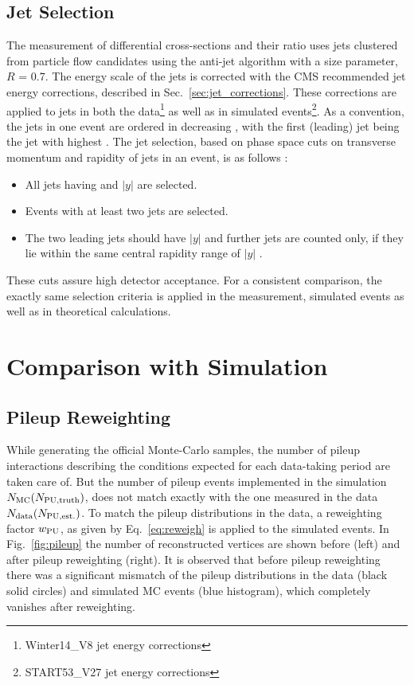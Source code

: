 \subsection{Jet Selection}
The measurement of differential cross-sections and their ratio uses jets clustered from particle flow candidates using the anti-\kt jet algorithm with a size parameter, $R$ = 0.7. The energy scale of the jets is corrected with the CMS recommended jet energy corrections, described in Sec.~\ref{sec:jet_corrections}. These corrections are applied to jets in both the data\footnote{Winter14\_V8 jet energy corrections} as well as in simulated events\footnote{START53\_V27 jet energy corrections}. As a convention, the jets in one event are ordered in decreasing \pt, with the first (leading) jet being the jet with highest \pt. The jet selection, based on phase space cuts on transverse momentum and rapidity of jets in an event, is as follows : 

\begin{itemize}
\item All jets having \pt {} \GeV and $|y|$  are selected.
\item Events with at least two jets are selected.
\item The two leading jets should have $|y|$  and further jets are counted only, if they lie within the same central rapidity range of $|y|$ . 
\end{itemize}

These cuts assure high detector acceptance. For a consistent comparison, the exactly same selection criteria is applied in the measurement, simulated events as well as in theoretical calculations. 

\section{Comparison with Simulation}
\subsection{Pileup Reweighting}
While generating the official Monte-Carlo samples, the number of pileup interactions describing the conditions expected for each data-taking period are taken care of. But the number of pileup events implemented in the simulation $N_{\rm MC} (N_{\rm PU,truth})$, does not match exactly with the one measured in the data $N_{\rm data} (N_{\rm PU,est.})$. To match the pileup distributions in the data, a reweighting factor $w_{\rm PU}$, as given by Eq.~\ref{eq:reweigh} is applied to the simulated events. In Fig.~\ref{fig:pileup} the number of reconstructed vertices are shown before (left) and after pileup reweighting (right). It is observed that before pileup reweighting there was a significant mismatch of the pileup distributions in the data (black solid circles) and simulated MC events (blue histogram), which completely vanishes after reweighting. 

